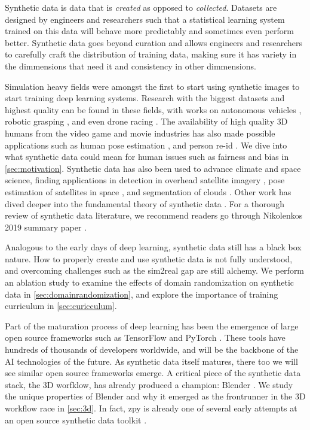 \documentclass{article}
\begin{document}
Synthetic data is data that is \emph{created} as opposed to \emph{collected}. Datasets are designed by engineers and researchers such that a statistical learning system trained on this data will behave more predictably and sometimes even perform better. Synthetic data goes beyond curation and allows engineers and researchers to carefully craft the distribution of training data, making sure it has variety in the dimmensions that need it and consistency in other dimmensions.

Simulation heavy fields were amongst the first to start using synthetic images to start training deep learning systems. Research with the biggest datasets and highest quality can be found in these fields, with works on autonomous vehicles \cite{prakash2020structured} \cite{srivastava2019multi} \cite{Hahner_2019} \cite{7780721}, robotic grasping \cite{james2019simtoreal} \cite{tobin2017domain}, and even drone racing \cite{Loquercio_2020}. The availability of high quality 3D humans from the video game and movie industries has also made possible applications such as human pose estimation  \cite{shrivastava2017learning} \cite{Varol_2017}, and person re-id \cite{aaronASRC}. We dive into what synthetic data could mean for human issues such as fairness and bias in \ref{sec:motivation}. Synthetic data has also been used to advance climate and space science, finding applications in detection in overhead satellite imagery \cite{shermeyer2020rareplanes}, pose estimation of satellites in space \cite{kisantal2020satellite}, and segmentation of clouds \cite{lyu2020learning}. Other work has dived deeper into the fundamental theory of synthetic data \cite{le2017using}. For a thorough review of synthetic data literature, we recommend readers go through Nikolenkos 2019 summary paper \cite{nikolenko2019synthetic}.

Analogous to the early days of deep learning, synthetic data still has a black box nature. How to properly create and use synthetic data is not fully understood, and overcoming challenges such as the sim2real gap are still alchemy. We perform an ablation study to examine the effects of domain randomization on synthetic data in \ref{sec:domainrandomization}, and explore the importance of training curriculum in \ref{sec:curicculum}.

Part of the maturation process of deep learning has been the emergence of large open source frameworks such as TensorFlow \cite{tensorflow} and PyTorch \cite{pytorch}. These tools have hundreds of thousands of developers worldwide, and will be the backbone of the AI technologies of the future. As synthetic data itself matures, there too we will see similar open source frameworks emerge. A critical piece of the synthetic data stack, the 3D worfklow, has already produced a champion: Blender \cite{blender}. We study the unique properties of Blender and why it emerged as the frontrunner in the 3D workflow race in \ref{sec:3d}. In fact, zpy is already one of several early attempts at an open source synthetic data toolkit \cite{denninger2019blenderproc} \cite{bpycv}.
\end{document}
